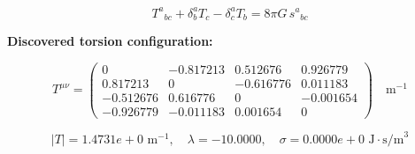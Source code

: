 
\begin{equation}
  T^a{}_{bc} + \delta^a_b T_c - \delta^a_c T_b = 8\pi G \, s^a{}_{bc}
\end{equation}

\textbf{Discovered torsion configuration:}

\begin{equation}
  T^{\mu\nu} = \begin{pmatrix}
    0 & -0.817213 & 0.512676 & 0.926779 \\
    0.817213 & 0 & -0.616776 & 0.011183 \\
    -0.512676 & 0.616776 & 0 & -0.001654 \\
    -0.926779 & -0.011183 & 0.001654 & 0
  \end{pmatrix} \quad \text{m}^{-1}
\end{equation}

\begin{equation}
  |T| = 1.4731e+0 \text{ m}^{-1}, \quad
  \lambda = -10.0000, \quad
  \sigma = 0.0000e+0 \text{ J}\cdot\text{s/m}^3
\end{equation}